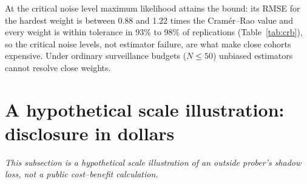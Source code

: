 \documentclass[12pt]{article}
\theoremstyle{definition}
\theoremstyle{remark}
\begin{document}
At the critical noise level maximum likelihood attains the bound: its RMSE for the hardest weight is between 0.88 and 1.22 times the Cram\'er--Rao value and every weight is within tolerance in 93\% to 98\% of replications (Table~\ref{tab:crb}), so the critical noise levels, not estimator failure, are what make close cohorts expensive. Under ordinary surveillance budgets ($N\le50$) unbiased estimators cannot resolve close weights.

\section{A hypothetical scale illustration: disclosure in dollars}\label{sec:disc_dollars}
\emph{This subsection is a hypothetical scale illustration of an outside prober's shadow loss, not a public cost--benefit calculation.}
\end{document}
